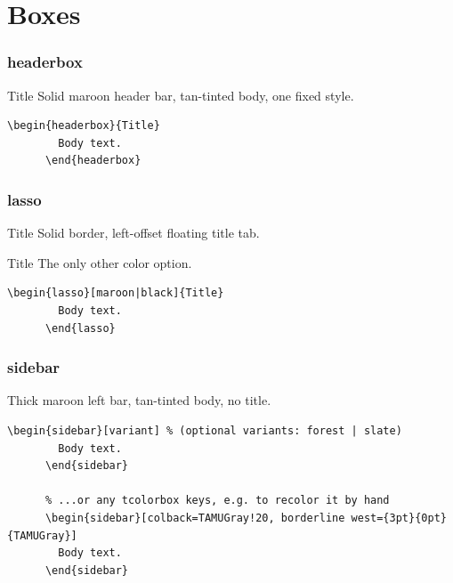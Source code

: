 \documentclass{ltx-talk}
\begin{document}
\section{Boxes}

\begin{frame*}
  \frametitle{headerbox}
  \begin{headerbox}{Title}
    Solid maroon header bar, tan-tinted body, one fixed style.
  \end{headerbox}

  \bigskip
  \begin{sidebar}
    \begin{Verbatim}[gobble=6]
      \begin{headerbox}{Title}
        Body text.
      \end{headerbox}
    \end{Verbatim}
  \end{sidebar}
\end{frame*}

\begin{frame*}
  \frametitle{lasso}
  \begin{lasso}{Title}
    Solid border, left-offset floating title tab.
  \end{lasso}

  \bigskip
  \begin{lasso}[black]{Title}
    The only other color option.
  \end{lasso}

  \bigskip
  \begin{sidebar}
    \begin{Verbatim}[gobble=6]
      \begin{lasso}[maroon|black]{Title}
        Body text.
      \end{lasso}
    \end{Verbatim}
  \end{sidebar}
\end{frame*}

\begin{frame*}
  \frametitle{sidebar}
  \begin{sidebar}
    Thick maroon left bar, tan-tinted body, no title.
  \end{sidebar}

  \bigskip
  \begin{sidebar}
    \begin{Verbatim}[gobble=6]
      \begin{sidebar}[variant] % (optional variants: forest | slate)
        Body text.
      \end{sidebar}

      % ...or any tcolorbox keys, e.g. to recolor it by hand
      \begin{sidebar}[colback=TAMUGray!20, borderline west={3pt}{0pt}{TAMUGray}]
        Body text.
      \end{sidebar}
    \end{Verbatim}
  \end{sidebar}
\end{frame*}
\end{document}
